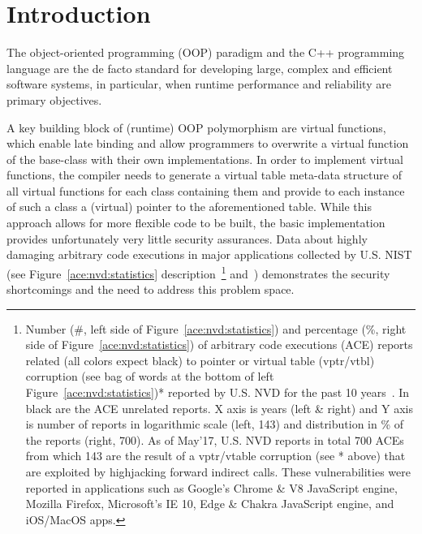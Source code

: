\section{Introduction}
\label{chapter:Introduction}

The object-oriented programming (OOP) paradigm and the C++ programming language are the de facto standard for developing large, complex and efficient software systems, in particular, 
when runtime performance and reliability are primary objectives.

A key building block of (runtime) OOP polymorphism are virtual functions, which enable late binding and allow programmers to overwrite a virtual function of the base-class with their 
own implementations. In order to implement virtual functions, the compiler needs to generate a virtual table meta-data structure of all virtual functions for each class containing 
them and provide to each instance of such a class a (virtual) pointer to the aforementioned table. While this approach allows for more flexible code to be built, 
the basic implementation provides unfortunately very little security assurances. Data about highly damaging arbitrary code executions in major applications collected by U.S. NIST 
(see Figure~\ref{ace:nvd:statistics} description~\footnote{Number (\#, left side of Figure~\ref{ace:nvd:statistics}) and percentage (\%, right side of Figure~\ref{ace:nvd:statistics}) 
of arbitrary code executions (ACE) reports related (all colors expect black) to pointer or virtual table (vptr/vtbl) corruption 
(see bag of words at the bottom of left Figure~\ref{ace:nvd:statistics})* reported by U.S. NVD for the past 10 years~\cite{NVD:ACE}. In black are the ACE unrelated reports.
X axis is years (left \& right) and Y axis is number of reports in logarithmic scale (left, 143) and distribution in \% of the reports (right, 700).
As of May'17, U.S. NVD reports in total 700 ACEs from which 143 are the result of a vptr/vtable corruption (see * above) that are exploited by highjacking forward indirect calls.
These vulnerabilities were reported in applications such as Google's Chrome \& V8 JavaScript engine, Mozilla Firefox, Microsoft's IE 10, Edge \& Chakra JavaScript engine, 
and iOS/MacOS apps.} 
and~\cite{NVD:ACE}) demonstrates the security shortcomings and the need to address this problem space.


